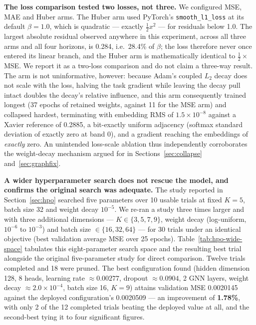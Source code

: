 \documentclass[journal]{IEEEtran}
\begin{document}
\textbf{The loss comparison tested two losses, not three.} We configured MSE, MAE
and Huber arms. The Huber arm used PyTorch's \texttt{smooth\_l1\_loss} at its
default $\beta = 1.0$, which is quadratic --- exactly $\tfrac{1}{2}x^2$ --- for
residuals below 1.0. The largest absolute residual observed anywhere in this
experiment, across all three arms and all four horizons, is 0.284, i.e.\ 28.4\% of
$\beta$; the loss therefore never once entered its linear branch, and the Huber
arm is mathematically identical to $\tfrac{1}{2}\times$MSE. We report it as a
two-loss comparison and do not claim a three-way result. The arm is not
uninformative, however: because Adam's coupled $L_2$ decay does not scale with the
loss, halving the task gradient while leaving the decay pull intact doubles the
decay's relative influence, and this arm consequently trained longest (37 epochs
of retained weights, against 11 for the MSE arm) and collapsed hardest,
terminating with embedding RMS of $1.5\times10^{-8}$ against a Xavier reference of
0.2885, a bit-exactly uniform adjacency (softmax standard deviation of exactly
zero at band 0), and a gradient reaching the embeddings of \emph{exactly} zero. An
unintended loss-scale ablation thus independently corroborates the weight-decay
mechanism argued for in Sections~\ref{sec:collapse} and~\ref{sec:graphfix}.

\textbf{A wider hyperparameter search does not rescue the model, and confirms the
original search was adequate.} The study reported in Section~\ref{sec:hpo}
searched five parameters over 10 usable trials at fixed $K=5$, batch size 32 and weight
decay $10^{-5}$. We re-ran a study three times larger and with three additional
dimensions --- $K \in \{3,5,7,9\}$, weight decay (log-uniform, $10^{-6}$ to
$10^{-3}$) and batch size $\in \{16,32,64\}$ --- for 30 trials under an identical
objective (best validation average MSE over 25 epochs). Table~\ref{tab:hpo-wide-space} tabulates this eight-parameter search space and the resulting best trial alongside the original five-parameter study for direct comparison. Twelve trials completed
and 18 were pruned. The best configuration found (hidden dimension 128, 8 heads,
learning rate $\approx 0.00277$, dropout $\approx 0.0904$, 2 GNN layers, weight
decay $\approx 2.0\times10^{-4}$, batch size 16, $K=9$) attains validation MSE
0.0020145 against the deployed configuration's 0.0020509 --- an improvement of
\textbf{1.78\%}, with only 2 of the 12 completed trials beating the deployed value
at all, and the second-best tying it to four significant figures.
\end{document}
